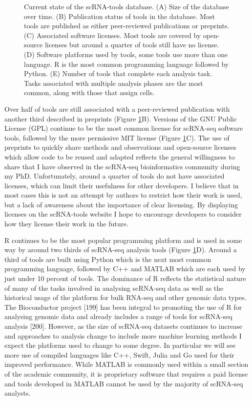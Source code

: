 \documentclass[11pt,a4paper,titlepage,twoside,openright]{style/unimelbthesis}
\theoremstyle{definition}
\theoremstyle{definition}
\theoremstyle{definition}
\theoremstyle{remark}
\begin{document}
\begin{mainmatter}
\begin{figure}
{}

\caption[Current state of the scRNA-tools database.]{Current state of the scRNA-tools database. (A) Size of the database over time. (B) Publication status of tools in the database. Most tools are published as either peer-reviewed publications or preprints. (C) Associated software licenses. Most tools are covered by open-source licenses but around a quarter of tools still have no license. (D) Software platforms used by tools, some tools use more than one language. R is the most common programming language followed by Python. (E) Number of tools that complete each analysis task. Tasks associated with multiple analysis phases are the most common, along with those that assign cells.}\label{fig:tools-plot}
\end{figure}





Over half of tools are still associated with a peer-reviewed publication with another third described in preprints (Figure \ref{fig:tools-plot}B). Versions of the GNU Public License (GPL) continue to be the most common license for scRNA-seq software tools, followed by the more permissive MIT license (Figure \ref{fig:tools-plot}C). The use of preprints to quickly share methods and observations and open-source licenses which allow code to be reused and adapted reflects the general willingness to share that I have observed in the scRNA-seq bioinformatics community during my PhD. Unfortunately, around a quarter of tools do not have associated licenses, which can limit their usefulness for other developers. I believe that in most cases this is not an attempt by authors to restrict how their work is used, but a lack of awareness about the importance of clear licensing. By displaying licenses on the scRNA-tools website I hope to encourage developers to consider how they license their work in the future.

R continues to be the most popular programming platform and is used in some way by around two thirds of scRNA-seq analysis tools (Figure \ref{fig:tools-plot}D). Around a third of tools are built using Python which is the next most common programming language, followed by C++ and MATLAB which are each used by just under 10 percent of tools. The dominance of R reflects the statistical nature of many of the tasks involved in analysing scRNA-seq data as well as the historical usage of the platform for bulk RNA-seq and other genomic data types. The Bioconductor project {[}199{]} has been integral to promoting the use of R for analysing genomic data and already includes a range of tools for scRNA-seq analysis {[}200{]}. However, as the size of scRNA-seq datasets continues to increase and approaches to analysis change to include more machine learning methods I expect the platforms used to change to some degree. In particular we will see more use of compiled languages like C++, Swift, Julia and Go used for their improved performance. While MATLAB is commonly used within a small section of the academic community, it is proprietary software that requires a paid license and tools developed in MATLAB cannot be used by the majority of scRNA-seq analysts.


\end{mainmatter}
\end{document}
